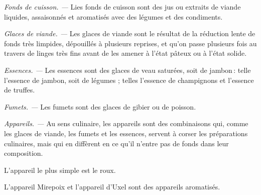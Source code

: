 
\textit{Fonds de cuisson. —} Lies fonds de cuisson sont des jus ou extraits de
viande liquides, assaisonnés et aromatisés avec des légumes et des condiments.

\textit{Glaces de viande. —} Les glaces de viande sont le résultat de la
réduction lente de fonds très limpides, dépouillés à plusieurs reprises, et
qu'on passe plusieurs fois au travers de linges très fins avant de les amener
à l'état pâteux ou à l'état solide.

\textit{Essences. —} Les essences sont des glaces de veau saturées, soit de
jambon : telle l'essence de jambon, soit de légumes ; telles l'essence de
champignons et l'essence de truffes.

\textit{Fumets. —} Les fumets sont des glaces de gibier ou de poisson.

\textit{Appareils. —} Au sens culinaire, les appareils sont des combinaisons
qui, comme les glaces de viande, les fumets et les essences, servent à corser
les préparations culinaires, mais qui en diffèrent en ce qu'il n'entre pas de
fonds dans leur composition.

L'appareil le plus simple est le roux.

L'appareil Mirepoix et l'appareil d'Uxel sont des appareils aromatisés.
